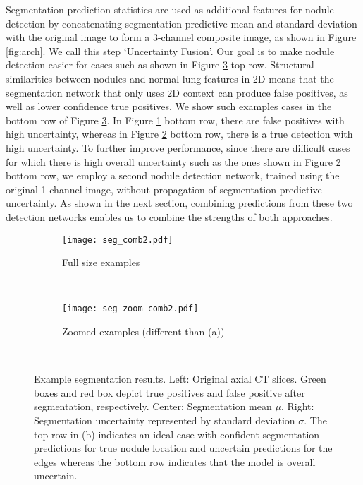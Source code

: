 \documentclass{article}
\begin{document}
Segmentation prediction statistics are used as additional features for nodule detection by concatenating segmentation predictive mean and standard deviation with the original image to form a 3-channel composite image, as shown in Figure \ref{fig:arch}. We call this step `Uncertainty Fusion'. Our goal is to make nodule detection easier for cases such as shown in Figure \ref{fig:seg_ex} top row. 
Structural similarities between nodules and normal lung features in 2D means that the segmentation network that only uses 2D context can produce false positives, as well as lower confidence true positives.
We show such examples cases in the bottom row of Figure \ref{fig:seg_ex}. In Figure \ref{fig:seg_ex_orig} bottom row, there are false positives with high uncertainty, whereas in Figure \ref{fig:seg_ex_zoom} bottom row, there is a true detection with high uncertainty. To further improve performance, since there are difficult cases for which there is high overall uncertainty such as the ones shown in Figure \ref{fig:seg_ex_zoom} bottom row, we employ a second nodule detection network, trained using the original 1-channel image, without propagation of segmentation predictive uncertainty. As shown in the next section, combining predictions from these two detection networks enables us to combine the strengths of both approaches. %





\begin{figure}[h!]
	\centering
	\begin{subfigure}[b]{0.49\textwidth}
		\texttt{[image: seg\_comb2.pdf]}
		\caption{Full size examples}
		\label{fig:seg_ex_orig}
	\end{subfigure}
	~ %
	\begin{subfigure}[b]{0.49\textwidth}
		\texttt{[image: seg\_zoom\_comb2.pdf]}
		\caption{Zoomed examples (different than (a))}
		\label{fig:seg_ex_zoom}
	\end{subfigure}
	\vspace{-.25cm}
	~ %
	\caption{Example segmentation results. Left: Original axial CT slices. Green boxes and red box depict true positives and false positive after segmentation, respectively. Center: Segmentation mean $\mu$. Right: Segmentation uncertainty represented by standard deviation $\sigma$. The top row in (b) indicates an ideal case with confident segmentation predictions for true nodule location and uncertain predictions for the edges whereas the bottom row indicates that the model is overall uncertain.}\label{fig:seg_ex}\vspace{-.25cm}
\end{figure}
\end{document}
